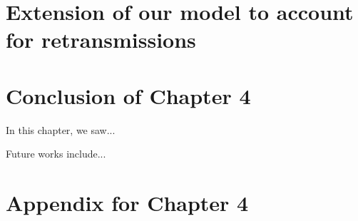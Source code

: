


\section{Extension of our model to account for retransmissions}
\label{sec:4:retransmissions}





\section{Conclusion of Chapter 4}
\label{sec:4:conclusion}

In this chapter, we saw...

Future works include...


\section{Appendix for Chapter 4}
\label{sec:4:appendix}

